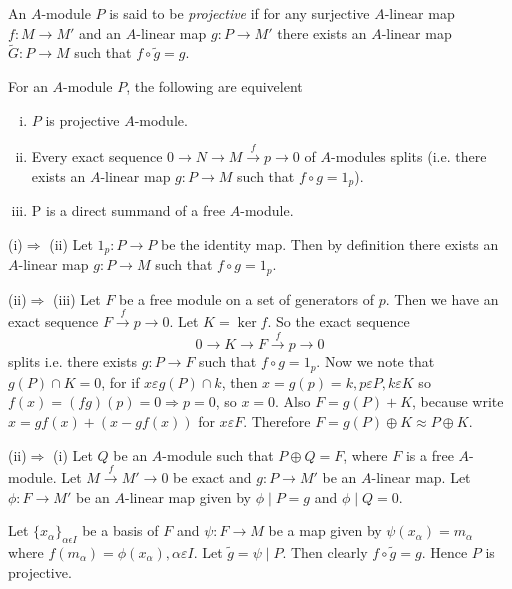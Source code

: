 \begin{dfn}\label{c4:dfn1.3}
An $A$-module $P$ is said to be \textit{projective} if for any
surjective $A$-linear map $f:M\rightarrow M'$ and an $A$-linear map
$g:P\rightarrow M'$ there exists an $A$-linear map
$\tilde{G}:P\rightarrow M$ such that $f\circ \tilde{g}=g$. 
\end{dfn}

\begin{lem}\label{c4:lem1.4}
For an $A$-module $P$, the following are equivelent
\begin{enumerate}[(i)]
\item $P$ is projective $A$-module.
\item Every exact sequence $0\rightarrow N\rightarrow
  M\xrightarrow{f}p\rightarrow 0$ of $A$-modules splits (i.e. there
  exists an $A$-linear map $g:P\rightarrow M$ such that $f\circ
  g=1_p$).
\item P is a direct summand of a free $A$-module.
\end{enumerate}
\end{lem}

\begin{Proof}
(i)$\Rightarrow$ (ii) Let $1_p:P\rightarrow P$ be the identity map. Then
  by definition there exists an $A$-linear map $g:P\rightarrow M$ such
  that $f\circ g=1_p$. 

(ii)$\Rightarrow$ (iii) Let $F$ be a free module on a set of generators
  of $p$. Then we have an exact sequence $F\xrightarrow{f}p\rightarrow
  0$. Let $K=\ker f$. So the exact sequence
$$
0\rightarrow K\rightarrow F\xrightarrow{f} p\rightarrow 0
$$
splits i.e. there exists $g:P\rightarrow F$ such that $f\circ
g=1_p$. Now we note that $g(P)\cap K=0$, for if $x \varepsilon
g(P)\cap k$, then $x=g(p)=k,p\varepsilon P,k\varepsilon K$ so
$f(x)=(fg)(p)=0\Rightarrow p=0$, so $x=0$. Also $F=g(P)+K$, because
write $x=gf(x)+(x-gf(x))$ for $x\varepsilon F$. Therefore
$F=g(P)\oplus K\approx P\oplus K$. 

(ii)$\Rightarrow$ (i) Let $Q$ be an $A$-module such that $P\oplus Q=F$,
where $F$ is a free $A$-module. Let $M\xrightarrow{f}M'\rightarrow 0$
be exact and $g:P\rightarrow M'$ be an $A$-linear map. Let
$\phi:F\rightarrow M'$ be an $A$-linear map given by $\phi\mid P=g$
and $\phi\mid Q=0$. 

Let $\{x_{\alpha}\}_{\alpha \epsilon I}$ be a basis of $F$ and
$\psi:F\rightarrow M$ be a map given by $\psi(x_{\alpha})=m_{\alpha}$
where $f(m_{\alpha})=\phi(x_{\alpha}),\alpha\varepsilon I$. Let
$\tilde{g}=\psi \mid P$. Then clearly $f\circ \tilde{g}=g$. Hence $P$
is projective.
\enprf
\end{Proof}

